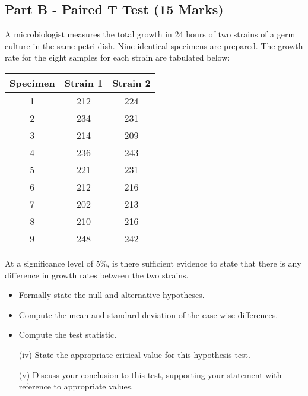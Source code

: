 

\subsection*{Part B - Paired T Test (15 Marks)} %
A microbiologist measures the total growth in 24 hours of two strains of a germ culture  in the same petri dish. Nine identical specimens are prepared. The growth rate for the eight samples for each strain are tabulated below:

\begin{center}
	\begin{tabular}{|c|c|c|} \hline 
		Specimen &	Strain 1	&	Strain 2	\\ \hline \hline
		1 & 212 & 224 \\ \hline
		2 & 234 & 231 \\ \hline
		3 & 214 & 209 \\ \hline
		4 & 236 & 243 \\ \hline
		5 & 221 & 231 \\ \hline 
		6 & 212 & 216 \\ \hline
		7 & 202 & 213 \\ \hline 
		8 & 210 & 216 \\ \hline
		9 & 248 & 242 \\ \hline
	\end{tabular} 
\end{center}
\noindent At a significance level of 5\%, is there sufficient evidence to state that there is any difference in growth rates between the two strains.


\bigskip

\begin{itemize}
\item Formally state the null and alternative hypotheses.
\item  Compute the mean and standard deviation of the case-wise differences.
\item Compute the test statistic.
	\item[(iv)] State the appropriate critical value for this hypothesis test.
	\item[(v)] Discuss your conclusion to this test, supporting your statement with reference to appropriate values.
\end{itemize}

%

\newpage

